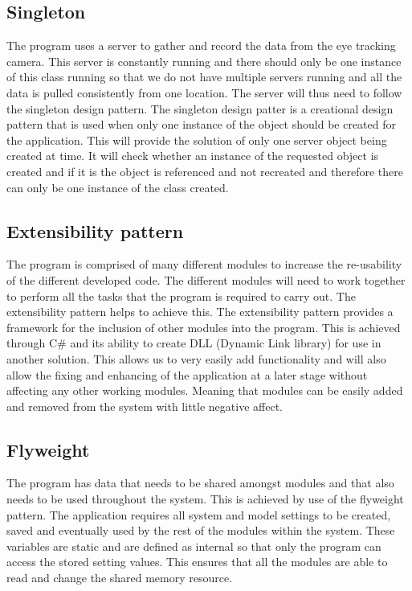 \subsection{Singleton}
The program uses a server to gather and record the data from the eye tracking camera. This server is constantly running and there should only be one instance of this class running so that we do not have multiple servers running and all the data is pulled consistently from one location. The server will thus need to follow the singleton design pattern. The singleton design patter is a creational design pattern that is used when only one instance of the object should be created for the application. This will provide the solution of only one server object being created at time. It will check whether an instance of the requested object is created and if it is the object is referenced and not recreated and therefore there can only be one instance of the class created.

\subsection{Extensibility pattern}
The program is comprised of many different modules to increase the re-usability of the different developed code. The different modules will need to work together to perform all the tasks that the program is required to carry out. The extensibility pattern helps to achieve this. The extensibility pattern provides a framework for the inclusion of other modules into the program. This is achieved through C\# and its ability to create DLL (Dynamic Link library) for use in another solution. This allows us to very easily add functionality and will also allow the fixing and enhancing of the application at a later stage without affecting any other working modules. Meaning that modules can be easily added and removed from the system with little negative affect.

\subsection{Flyweight}
The program has data that needs to be shared amongst modules and that also needs to be used throughout the system. This is achieved by use of the flyweight pattern. The application requires all system and model settings to be created, saved and eventually used by the rest of the modules within the system. These variables are static and are defined as internal so that only the program can access the stored setting values. This ensures that all the modules are able to read and change the shared memory resource.

